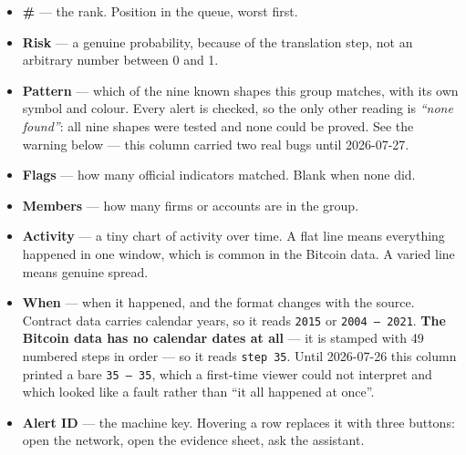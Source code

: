 \documentclass[11pt,a4paper]{article}
\newcommand{\code}[1]{\texttt{\small #1}}
\begin{document}
\begin{itemize}
  \item \textbf{\#} --- the rank. Position in the queue, worst first.
  \item \textbf{Risk} --- a genuine probability, because of the translation step,
        not an arbitrary number between 0 and 1.
        \item \textbf{Pattern} --- which of the nine known shapes this group
        matches, with its own symbol and colour. Every alert is checked, so the
        only other reading is \emph{``none found''}: all nine shapes were tested
        and none could be proved. See the warning below --- this column carried
        two real bugs until 2026-07-27.
  \item \textbf{Flags} --- how many official indicators matched. Blank when none
        did.
  \item \textbf{Members} --- how many firms or accounts are in the group.
  \item \textbf{Activity} --- a tiny chart of activity over time. A flat line
        means everything happened in one window, which is common in the Bitcoin
        data. A varied line means genuine spread.
  \item \textbf{When} --- when it happened, and the format changes with the
        source. Contract data carries calendar years, so it reads \code{2015} or
        \code{2004 -- 2021}. \textbf{The Bitcoin data has no calendar dates at
        all} --- it is stamped with 49 numbered steps in order --- so it reads
        \code{step 35}. Until 2026-07-26 this column printed a bare
        \code{35 -- 35}, which a first-time viewer could not interpret and which
        looked like a fault rather than ``it all happened at once''.
  \item \textbf{Alert ID} --- the machine key. Hovering a row replaces it with
        three buttons: open the network, open the evidence sheet, ask the
        assistant.
\end{itemize}
\end{document}
